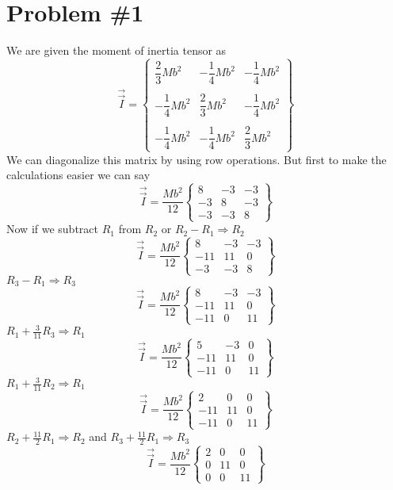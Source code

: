 \documentclass[11pt]{article}
\numberwithin{equation}{section}
\begin{document}


\section{Problem \#1}
We are given the moment of inertia tensor as
$$\vec{\vec{I}} = \left\{\begin{array}{ccc}
	\dfrac{2}{3}Mb^2	&-\dfrac{1}{4}Mb^2	&-\dfrac{1}{4}Mb^2\\
\\
	-\dfrac{1}{4}Mb^2	&\dfrac{2}{3}Mb^2	&-\dfrac{1}{4}Mb^2\\
\\
	-\dfrac{1}{4}Mb^2	&-\dfrac{1}{4}Mb^2	&\dfrac{2}{3}Mb^2	
		\end{array}\right\}$$
We can diagonalize this matrix by using row operations. But first to make the calculations easier we can say 
$$\vec{\vec{I}} = \frac{Mb^2}{12}\left\{\begin{array}{ccc}
	8	&-3	&-3\\
	-3	&8	&-3\\
	-3	&-3	&8
		\end{array}\right\}$$
Now if we subtract $R_1$ from $R_2$ or $R_2-R_1\Rightarrow R_2$
$$\vec{\vec{I}} = \frac{Mb^2}{12}\left\{\begin{array}{ccc}
	8	&-3	&-3\\
	-11	&11	&0\\
	-3	&-3	&8
		\end{array}\right\}$$
$R_3-R_1\Rightarrow R_3$
$$\vec{\vec{I}} = \frac{Mb^2}{12}\left\{\begin{array}{ccc}
	8	&-3	&-3\\
	-11	&11	&0\\
	-11	&0	&11
		\end{array}\right\}$$
$R_1+\frac{3}{11}R_3\Rightarrow R_1$
$$\vec{\vec{I}} = \frac{Mb^2}{12}\left\{\begin{array}{ccc}
	5	&-3	&0\\
	-11	&11	&0\\
	-11	&0	&11
		\end{array}\right\}$$
$R_1+\frac{3}{11}R_2\Rightarrow R_1$
$$\vec{\vec{I}} = \frac{Mb^2}{12}\left\{\begin{array}{ccc}
	2	&0	&0\\
	-11	&11	&0\\
	-11	&0	&11
		\end{array}\right\}$$
$R_2+\frac{11}{2}R_1\Rightarrow R_2$ and $R_3+\frac{11}{2}R_1\Rightarrow R_3$
$$\vec{\vec{I}} = \frac{Mb^2}{12}\left\{\begin{array}{ccc}
	2	&0	&0\\
	0	&11	&0\\
	0	&0	&11
		\end{array}\right\}$$
\end{document}
